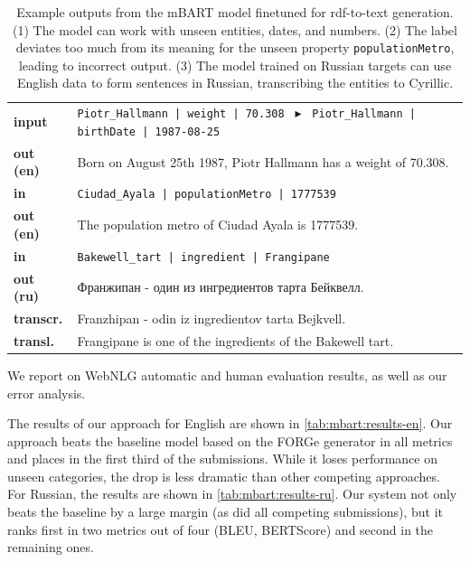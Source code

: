 \documentclass[12pt,notitlepage,a4paper,oneside,openany]{report}
\renewcommand\cite{\citep}
\begin{document}
\begin{table}[t]
    \footnotesize
    \centering
    \begin{tabular}{@{}lp{12.7cm}@{}}
        \textbf{input}    & \texttt{Piotr\_Hallmann | weight | 70.308 }  $\blacktriangleright$ \texttt{ Piotr\_Hallmann | birthDate | 1987-08-25} \\
        \textbf{out (en)} & Born on August 25th 1987, Piotr Hallmann has a weight of 70.308.                                                      \\
        \midrule
        \textbf{in}       & \texttt{Ciudad\_Ayala | populationMetro | 1777539}                                                                    \\
        \textbf{out (en)} & The population metro of Ciudad Ayala is 1777539.                                                                      \\
        \midrule
        \textbf{in}       & \texttt{Bakewell\_tart | ingredient | Frangipane}                                                                     \\
        \textbf{out (ru)} & Франжипан - один из ингредиентов тарта Бейквелл.                                                                      \\[0.1cm]
        \textbf{transcr.} & Franzhipan - odin iz ingredientov tarta Bejkvell.                                                                     \\
        \textbf{transl.}  & Frangipane is one of the ingredients of the Bakewell tart.                                                            \\
    \end{tabular}
    \caption[Example outputs from the mBART model.]{Example outputs from the mBART model finetuned for \ac{rdf}-to-text generation. (1) The model can work with unseen entities, dates, and numbers. (2) The label deviates too much from its meaning for the unseen property \texttt{populationMetro}, leading to incorrect output. (3) The model trained on Russian targets can use English data to form sentences in Russian, transcribing the entities to Cyrillic.}
    \label{tab:mbart:examples}
\end{table}

We report on WebNLG automatic and human evaluation results, as well as our error analysis.

The results of our approach for English are shown in \autoref{tab:mbart:results-en}. Our approach beats the baseline model based on the FORGe generator \cite{mille2019teaching} in all metrics and places in the first third of the submissions. While it loses performance on unseen categories, the drop is less dramatic than other competing approaches. For Russian, the results are shown in \autoref{tab:mbart:results-ru}. Our system not only beats the baseline by a large margin (as did all competing submissions), but it ranks first in two metrics out of four (BLEU, BERTScore) and second in the remaining ones.
\end{document}
